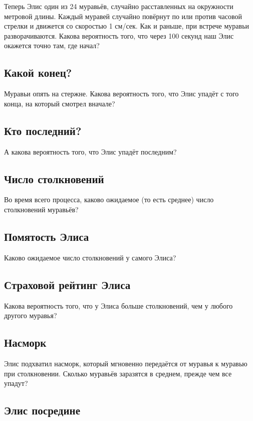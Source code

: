 Теперь Элис один из 24 муравьёв, случайно расставленных на окружности метровой длины.
Каждый муравей случайно повёрнут по или против часовой стрелки и движется со скоростью 1 см/сек.
Как и раньше, при встрече муравьи разворачиваются.
Какова вероятность того, что через 100 секунд наш Элис окажется точно там, где начал?

\subsection*{Какой конец?}

Муравьи опять на стержне.
Какова вероятность того, что Элис упадёт с того конца, на который смотрел вначале?

\subsection*{Кто последний?}

А какова вероятность того, что Элис упадёт последним?

\subsection*{Число столкновений}

Во время всего процесса, каково ожидаемое (то есть среднее) число столкновений муравьёв?

\subsection*{Помятость Элиса}

Каково ожидаемое число столкновений у самого Элиса?

\subsection*{Страховой рейтинг Элиса}

Какова вероятность того, что у Элиса больше столкновений, чем у любого другого муравья?

\subsection*{Насморк}

Элис подхватил насморк, который мгновенно передаётся от муравья к муравью при столкновении.
Сколько муравьёв заразятся в среднем, прежде чем все упадут?

\subsection*{Элис посредине}

